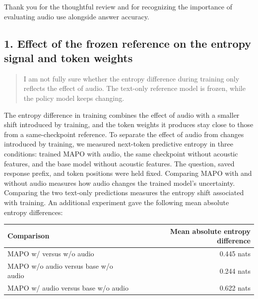 Thank you for the thoughtful review and for recognizing the importance of evaluating audio use alongside answer accuracy.

\subsection*{1. Effect of the frozen reference on the entropy signal and token weights}

\begin{quote}\small\color{ReviewQuote}
I am not fully sure whether the entropy difference during training only reflects the effect of audio. The text-only reference model is frozen, while the policy model keeps changing.

\end{quote}

The entropy difference in training combines the effect of audio with a smaller shift introduced by training, and the token weights it produces stay close to those from a same-checkpoint reference. To separate the effect of audio from changes introduced by training, we measured next-token predictive entropy in three conditions: trained MAPO with audio, the same checkpoint without acoustic features, and the base model without acoustic features. The question, saved response prefix, and token positions were held fixed. Comparing MAPO with and without audio measures how audio changes the trained model's uncertainty. Comparing the two text-only predictions measures the entropy shift associated with training. An additional experiment gave the following mean absolute entropy differences:

\par\medskip
\begingroup
\small
\setlength{\tabcolsep}{5pt}
\renewcommand{\arraystretch}{1.2}
\noindent\begin{tabularx}{\linewidth}{@{}LR@{}}
\toprule
\textbf{Comparison} & \textbf{Mean absolute entropy difference} \\
\midrule
MAPO w/ versus w/o audio & 0.445 nats \\
MAPO w/o audio versus base w/o audio & 0.244 nats \\
MAPO w/ audio versus base w/o audio & 0.622 nats \\
\bottomrule
\end{tabularx}
\par\endgroup\medskip

